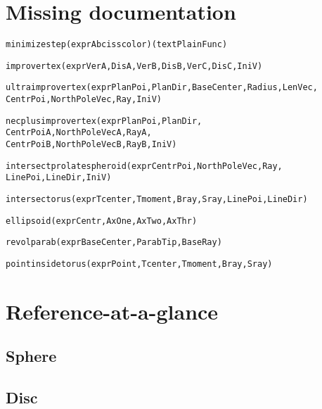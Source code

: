 \section{Missing documentation}
\begin{alltt}
minimizestep( expr Abcisscolor )( text PlainFunc )

improvertex( expr VerA, DisA, VerB, DisB, VerC, DisC, IniV )

ultraimprovertex( expr PlanPoi, PlanDir, BaseCenter, Radius, LenVec,
        CentrPoi, NorthPoleVec, Ray, IniV )

necplusimprovertex( expr PlanPoi, PlanDir,
	CentrPoiA, NorthPoleVecA, RayA,
        CentrPoiB, NorthPoleVecB, RayB, IniV )

intersectprolatespheroid( expr CentrPoi, NorthPoleVec, Ray,
        LinePoi, LineDir, IniV )

intersectorus( expr Tcenter, Tmoment, Bray, Sray, LinePoi, LineDir )

ellipsoid( expr Centr, AxOne, AxTwo, AxThr )

revolparab( expr BaseCenter, ParabTip, BaseRay )

pointinsidetorus( expr Point, Tcenter, Tmoment, Bray, Sray )
\end{alltt}




\section{Reference-at-a-glance}

\subsection{Sphere}


\subsection{Disc}


